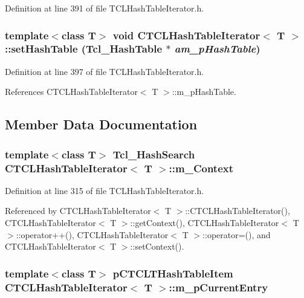 Definition at line 391 of file TCLHash\-Table\-Iterator.h.
\subsubsection{\setlength{\rightskip}{0pt plus 5cm}template$<$class T$>$ void CTCLHash\-Table\-Iterator$<$ T $>$::set\-Hash\-Table (Tcl\_\-Hash\-Table $\ast$ {\em am\_\-p\-Hash\-Table})\hspace{0.3cm}{\tt  [inline]}}\label{classCTCLHashTableIterator_a10}




Definition at line 397 of file TCLHash\-Table\-Iterator.h.

References CTCLHash\-Table\-Iterator$<$ T $>$::m\_\-p\-Hash\-Table.

\subsection{Member Data Documentation}
\subsubsection{\setlength{\rightskip}{0pt plus 5cm}template$<$class T$>$ Tcl\_\-Hash\-Search CTCLHash\-Table\-Iterator$<$ T $>$::m\_\-Context\hspace{0.3cm}{\tt  [private]}}\label{classCTCLHashTableIterator_o0}




Definition at line 315 of file TCLHash\-Table\-Iterator.h.

Referenced by CTCLHash\-Table\-Iterator$<$ T $>$::CTCLHash\-Table\-Iterator(), CTCLHash\-Table\-Iterator$<$ T $>$::get\-Context(), CTCLHash\-Table\-Iterator$<$ T $>$::operator++(), CTCLHash\-Table\-Iterator$<$ T $>$::operator=(), and CTCLHash\-Table\-Iterator$<$ T $>$::set\-Context().
\subsubsection{\setlength{\rightskip}{0pt plus 5cm}template$<$class T$>$ {\bf p\-CTCLTHash\-Table\-Item} CTCLHash\-Table\-Iterator$<$ T $>$::m\_\-p\-Current\-Entry\hspace{0.3cm}{\tt  [private]}}\label{classCTCLHashTableIterator_o1}




